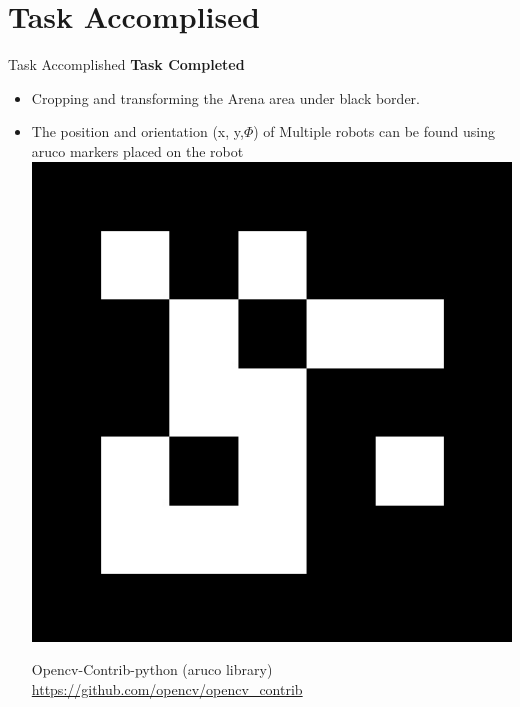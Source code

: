 \documentclass[11pt, a4paper]{beamer}
\begin{document}
\section{Task Accomplised}
\begin{frame}{Task Accomplished}
	\textbf{Task Completed}
	\begin{itemize}	
	\item Cropping and transforming the Arena area under black border.
		\item The position and orientation (x, y,$\Phi$) of Multiple robots can be found using aruco markers placed on the robot\\
		\includegraphics[scale =.1]{images/aruco.jpg}
		
		
		 Opencv-Contrib-python (aruco library)\\ \url{https://github.com/opencv/opencv_contrib}
\end{itemize}
\end{frame}	
\end{document}
